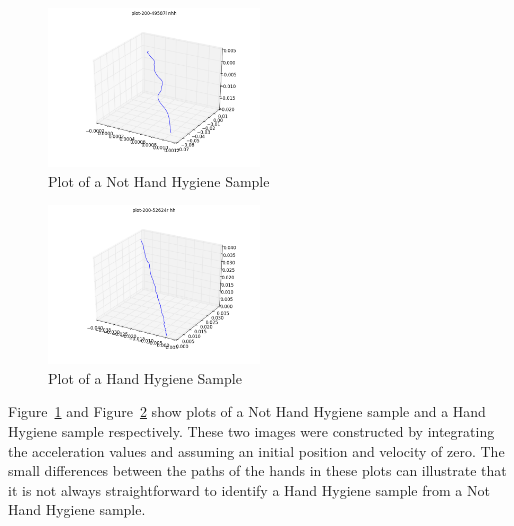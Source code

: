 \documentclass[]{report}
\begin{document}
\begin{figure}
	\centering
	\includegraphics[width=0.5\textwidth]{../code/plots/plot-200-49587l}
	\caption{Plot of a Not Hand Hygiene Sample}
	\label{nhh-plot}
\end{figure}

\begin{figure}
	\centering
	\includegraphics[width=0.5\textwidth]{../code/plots/plot-200-52624r}
	\caption{Plot of a Hand Hygiene Sample}
	\label{hh-plot}
\end{figure}

Figure~\ref{nhh-plot} and Figure~\ref{hh-plot} show plots of a Not Hand Hygiene sample and a Hand Hygiene sample respectively. These two images were constructed by integrating the acceleration values and assuming an initial position and velocity of zero. The small differences between the paths of the hands in these plots can illustrate that it is not always straightforward to identify a Hand Hygiene sample from a Not Hand Hygiene sample.
\end{document}
